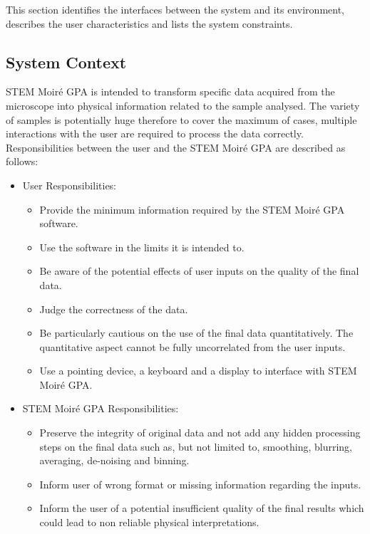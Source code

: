 \documentclass[12pt]{article}
\newcommand{\progname}{STEM Moir{\'e} GPA}
\begin{document}
This section identifies the interfaces between the system and its environment,
describes the user characteristics and lists the system constraints.

\subsection{System Context}

\progname{} is intended to transform specific data acquired from the microscope into physical information related to the sample analysed. The variety of samples is potentially huge therefore to cover the maximum of cases, multiple interactions with the user are required to process the data correctly. Responsibilities between the user and the \progname{} are described as follows:

\begin{itemize}
\item User Responsibilities:
\begin{itemize}
\item Provide the minimum information required by the \progname{} software.
\item Use the software in the limits it is intended to. 
\item Be aware of the potential effects of user inputs on the quality of the final data.
\item Judge the correctness of the data.
\item Be particularly cautious on the use of the final data quantitatively. The quantitative aspect cannot be fully uncorrelated from the user inputs. 
\item Use a pointing device, a keyboard and a display to interface with \progname{}.
\end{itemize}
\item \progname{} Responsibilities:
\begin{itemize}
\item Preserve the integrity of original data and not add any hidden processing steps on the final data such as, but not limited to, smoothing, blurring, averaging, de-noising and binning.
\item Inform user of wrong format or missing information regarding the inputs.
\item Inform the user of a potential insufficient quality of the final results which could lead to non reliable physical interpretations.
\end{itemize}
\end{itemize}
\end{document}
